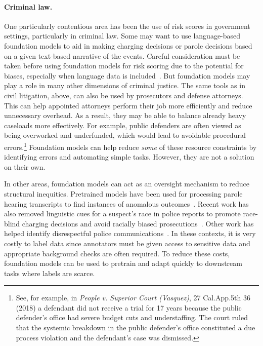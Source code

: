 \paragraph{Criminal law.} One particularly contentious area has been the use of risk scores in government settings, particularly in criminal law. Some may want to use language-based foundation models to aid in making charging decisions or parole decisions based on a given text-based narrative of the events. Careful consideration must be taken before using foundation models for risk scoring due to the potential for biases, especially when language data is included~\citep{bender2021,berk2021justice,laufer2020feedback}. But foundation models may play a role in many other dimensions of criminal justice. The same tools as in civil litigation, above, can also be used by prosecutors and defense attorneys. This can help appointed attorneys perform their job more efficiently and reduce unnecessary overhead. As a result, they may be able to balance already heavy caseloads more effectively. For example, public defenders are often viewed as being overworked and underfunded, which would lead to avoidable procedural errors.\footnote{See, for example, in \textit{People v. Superior Court (Vasquez)}, 27 Cal.App.5th 36 (2018) a defendant did not receive a trial for 17 years because the public defender's office had severe budget cuts and understaffing. The court ruled that the systemic breakdown in the public defender's office constituted a due process violation and the defendant's case was dismissed.} Foundation models can help reduce \textit{some} of these resource constraints by identifying errors and automating simple tasks. However, they are not a solution on their own.

In other areas, foundation models can act as an oversight mechanism to reduce structural inequities. Pretrained models have been used for processing parole hearing transcripts to find instances of anomalous outcomes~\citep{bell2021recon}. Recent work has also removed linguistic cues for a suspect's race in police reports to promote race-blind charging decisions and avoid racially biased prosecutions~\citep{chohlas2020blind}. Other work has helped identify disrespectful police communications~\citep{voigt2017language}. In these contexts, it is very costly to label data since annotators must be given access to sensitive data and appropriate background checks are often required. To reduce these costs, foundation models can be used to pretrain and adapt quickly to downstream tasks where labels are scarce. 

